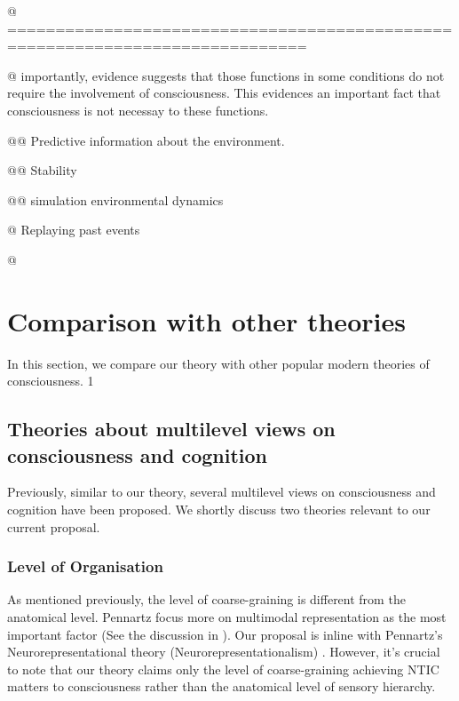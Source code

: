 \documentclass[utf8]{article}
\begin{document}
\begin{WritingMaterials}
            @ =============================================================================
            
	        @ importantly, evidence suggests that those functions in some conditions do not require the involvement of consciousness. This evidences an important fact that consciousness is not necessay to these functions. 
	        
	        
	        @@ Predictive information about the environment.
	        
	        @@ Stability 
	        
	        @@ simulation environmental dynamics 
	        
	        @ Replaying past events
	        
	        @  \cite{van2012role}
	        
	    \end{WritingMaterials}
	    


	\section{Comparison with other theories}
	In this section, we compare our theory with other popular modern theories of consciousness. 1

		\subsection{Theories about multilevel views on consciousness and cognition}
		Previously, similar to our theory, several multilevel views on consciousness and cognition have been proposed. We shortly discuss two theories relevant to our current proposal.
            \subsubsection*{Level of Organisation \cite{wimsatt1994ontology}}
                As mentioned previously, the level of coarse-graining is different from the anatomical level.
                Pennartz focus more on multimodal representation as the most important factor (See the discussion in \cite{pennartz2015brain}). Our proposal is inline with Pennartz's Neurorepresentational  theory (Neurorepresentationalism) \cite{pennartz2018consciousness,pennartz2015brain}. However, it’s crucial to note that our theory claims only the level of coarse-graining achieving NTIC matters to consciousness rather than the anatomical level of sensory hierarchy. 
\end{document}
